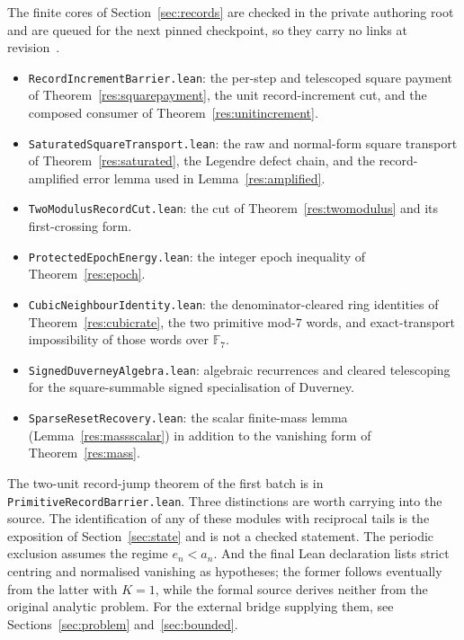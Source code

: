 The finite cores of Section~\ref{sec:records} are checked in the private
authoring root and are queued for the next pinned checkpoint, so they carry no
links at revision~\commitshort.
\begin{itemize}
\item \texttt{RecordIncrementBarrier.lean}: the per-step and telescoped square
  payment of Theorem~\ref{res:squarepayment}, the unit record-increment cut,
  and the composed consumer of Theorem~\ref{res:unitincrement}.
\item \texttt{SaturatedSquareTransport.lean}: the raw and normal-form square
  transport of Theorem~\ref{res:saturated}, the Legendre defect chain, and the
  record-amplified error lemma used in Lemma~\ref{res:amplified}.
\item \texttt{TwoModulusRecordCut.lean}: the cut of
  Theorem~\ref{res:twomodulus} and its first-crossing form.
\item \texttt{ProtectedEpochEnergy.lean}: the integer epoch inequality of
  Theorem~\ref{res:epoch}.
\item \texttt{CubicNeighbourIdentity.lean}: the denominator-cleared ring
  identities of Theorem~\ref{res:cubicrate}, the two primitive mod-$7$ words,
  and exact-transport impossibility of those words over $\mathbb F_7$.
\item \texttt{SignedDuverneyAlgebra.lean}: algebraic recurrences and cleared
  telescoping for the square-summable signed specialisation of Duverney.
\item \texttt{SparseResetRecovery.lean}: the scalar finite-mass lemma
  (Lemma~\ref{res:massscalar}) in addition to the vanishing form of
  Theorem~\ref{res:mass}.
\end{itemize}
The two-unit record-jump theorem of the first batch is in
\texttt{PrimitiveRecordBarrier.lean}.  Three distinctions are worth carrying into
the source.  The
identification of any of these modules with reciprocal tails is the exposition
of Section~\ref{sec:state} and is not a checked statement.  The periodic exclusion
assumes the regime $e_n<a_n$.  And the final Lean declaration lists strict
centring and normalised vanishing as hypotheses; the former follows eventually
from the latter with $K=1$, while the formal source derives neither from the
original analytic problem.  For the external bridge supplying them,
see Sections~\ref{sec:problem} and~\ref{sec:bounded}.

\iffalse

